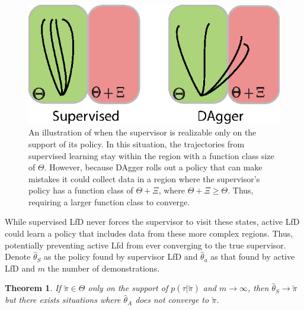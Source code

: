 \documentclass[10pt, conference]{ieeeconf}      %
\newtheorem{theorem}{Theorem}[section]
\begin{document}
\begin{figure}
\centering
\includegraphics{f_figs/dif_support.eps}
\caption{
    \footnotesize
An illustration of when the supervisor is realizable only on the support of its policy. In this situation, the trajectories from supervised learning stay within the region with a function class size of $\Theta$. However, because DAgger rolls out a policy that can make mistakes it could collect data in a region where the supervisor's policy has a function class of $\Theta +\Xi$, where $\Theta+\Xi \geq \Theta$. Thus, requiring a larger function class to converge. }
\vspace*{-20pt}
\label{fig:var}
\end{figure}


While supervised LfD never forces the supervisor to visit these states, active LfD  could learn a  policy that includes data from these more complex regions. Thus, potentially preventing active Lfd from ever converging to the true supervisor. Denote $\hat{\theta}_S$ as the policy found by supervisor LfD and $\hat{\theta}_a$ as that found by active LfD and $m$ the number of demonstrations. \\

\begin{theorem}
If $\tilde{\pi} \in \Theta$ only on the support of $p(\tau|\tilde{\pi})$ and $m\rightarrow \infty$, then $\hat{\theta}_S \rightarrow \tilde{\pi}$ but there exists situations where $\hat{\theta}_A$ does not converge to $\tilde{\pi}$.\\
\end{theorem}
\end{document}
